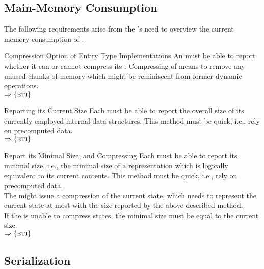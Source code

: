 \documentclass[a4paper, 12pt]{book}
\newcommand{\INTERFACE}[1]{$\Rightarrow\left\{#1\right\}$}
\begin{document}
\subsection{Main-Memory Consumption}

The following requirements arise from the \SYNEIGHT's need to overview
the current memory consumption of . 
%
\begin{requirement*}{Compression Option of Entity Type Implementations}
  An  must be able to report whether it can or
  cannot compress its . Compressing of
   means to remove any unused chunks of memory which
  might be reminiscent from former dynamic operations.\\
  \INTERFACE{\ETI}
\end{requirement*}
%
\begin{requirement*}{Reporting its Current Size}
  Each  must be able to report the overall size of its
  currently employed internal data-structures.
  This method must be quick, i.e., rely on precomputed data.\\
  \INTERFACE{\ETI}
\end{requirement*}
%
\begin{requirement*}{Report its Minimal Size, and Compressing}
  Each  must be able to report its minimal size, i.e.,
  the minimal size of a representation which is logically equivalent to its
  current contents. This method must be quick, i.e., rely on precomputed
  data.\\
  The \SYNEIGHT might issue a compression of the current state, which
  needs to represent the current state at most with the size reported by the
  above described method.\\
  If the  is unable to compress 
  states, the minimal size must be equal to the current size.\\
  \INTERFACE{\ETI}
\end{requirement*}

\subsection{Serialization}
\end{document}
